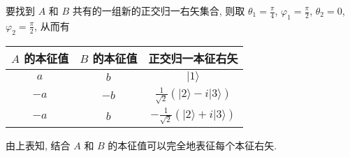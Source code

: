 \documentclass{assignment}
\begin{document}
\begin{sol}
\begin{itemize}
        要找到 $A$ 和 $B$ 共有的一组新的正交归一右矢集合, 则取 $\theta_1=\frac{\pi}{4}$, $\varphi_1=\frac{\pi}{2}$, $\theta_2=0$, $\varphi_2=\frac{\pi}{2}$, 从而有
        \begin{table}[H]
            \centering
            \begin{tabular}{|c|c|c|}
            \hline
            $A$ 的本征值 & $B$ 的本征值 & 正交归一本征右矢 \\ \hline
            $a$ & $b$ & $\lvert 1\rangle$ \\ \hline
            $-a$ & $-b$ & $\frac{1}{\sqrt{2}}(\lvert 2\rangle-i\lvert 3\rangle)$ \\ \hline
            $-a$ & $b$ & $-\frac{1}{\sqrt{2}}(\lvert 2\rangle+i\lvert 3\rangle)$ \\ \hline
            \end{tabular}
        \end{table}
        由上表知, 结合 $A$ 和 $B$ 的本征值可以完全地表征每个本征右矢.
    \end{itemize}
\end{sol}
\end{document}
